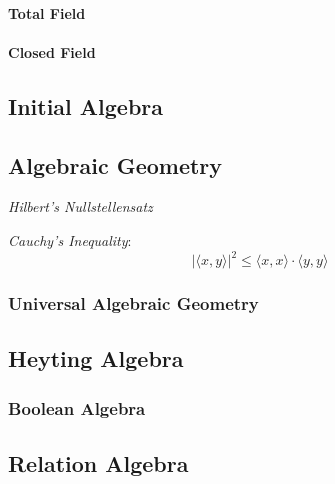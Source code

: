 \paragraph{Total Field}\label{subsec:total_field}

\paragraph{Closed Field}\label{subsec:closed_field}

\subsection{Initial Algebra}\label{subsec:initial_algebra}

\subsection{Algebraic Geometry}\label{subsec:algebraic_geometry}

\emph{Hilbert's Nullstellensatz}

\emph{Cauchy's Inequality}:
\[
    |\langle x,y \rangle|^2 \leq \langle x,x \rangle \cdot \langle
    y,y \rangle
\]

\subsubsection{Universal Algebraic Geometry}

\subsection{Heyting Algebra}\label{subsec:heyting_algebra}

\subsubsection{Boolean Algebra}\label{subsec:boolean_algebra}

\subsection{Relation Algebra}
